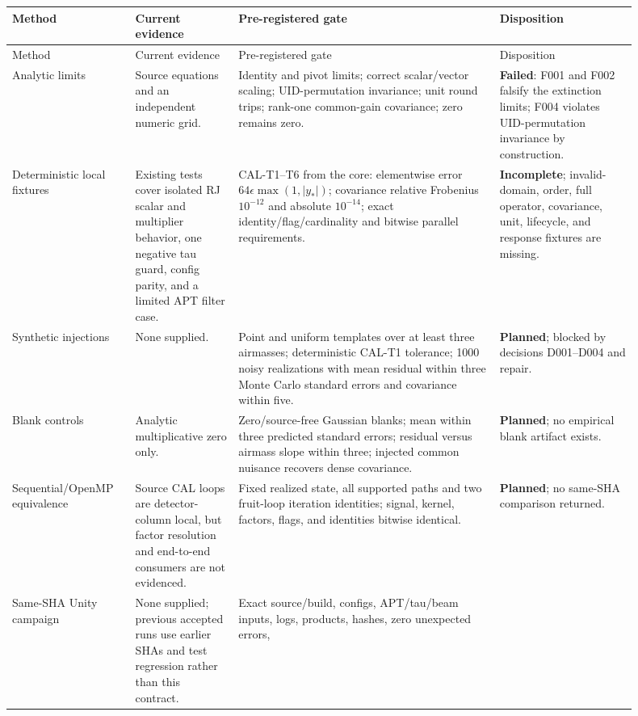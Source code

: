 \documentclass[11pt]{article}
\begin{document}
\begin{longtable}{L{0.17\linewidth}L{0.15\linewidth}L{0.38\linewidth}L{0.20\linewidth}}
\toprule
Method & Current evidence & Pre-registered gate & Disposition\\
\midrule
\endfirsthead
\toprule
Method & Current evidence & Pre-registered gate & Disposition\\
\midrule
\endhead
Analytic limits & Source equations and an independent numeric grid. &
Identity and pivot limits; correct scalar/vector scaling; UID-permutation
invariance; unit round trips; rank-one common-gain covariance; zero remains
zero. & \textbf{Failed}: F001 and F002 falsify the extinction limits; F004
violates UID-permutation invariance by construction.\\
Deterministic local fixtures & Existing tests cover isolated RJ scalar and
multiplier behavior, one negative tau guard, config parity, and a limited APT
filter case. & CAL-T1--T6 from the core: elementwise error
\(64\epsilon\max(1,|y_*|)\); covariance relative Frobenius \(10^{-12}\) and
absolute \(10^{-14}\); exact identity/flag/cardinality and bitwise parallel
requirements. & \textbf{Incomplete}; invalid-domain, order, full operator,
covariance, unit, lifecycle, and response fixtures are missing.\\
Synthetic injections & None supplied. & Point and uniform templates over at
least three airmasses; deterministic CAL-T1 tolerance; 1000 noisy realizations
with mean residual within three Monte Carlo standard errors and covariance
within five. & \textbf{Planned}; blocked by decisions D001--D004 and repair.\\
Blank controls & Analytic multiplicative zero only. & Zero/source-free
Gaussian blanks; mean within three predicted standard errors; residual versus
airmass slope within three; injected common nuisance recovers dense covariance.
& \textbf{Planned}; no empirical blank artifact exists.\\
Sequential/\allowbreak OpenMP equivalence & Source CAL loops are detector-column local,
but factor resolution and end-to-end consumers are not evidenced. & Fixed
realized state, all supported paths and two fruit-loop iteration identities;
signal, kernel, factors, flags, and identities bitwise identical. &
\textbf{Planned}; no same-SHA comparison returned.\\
Same-SHA Unity campaign & None supplied; previous accepted runs use earlier
SHAs and test regression rather than this contract. & Exact source/build,
configs, APT/tau/beam inputs, logs, products, hashes, zero unexpected errors,

\end{longtable}
\end{document}
